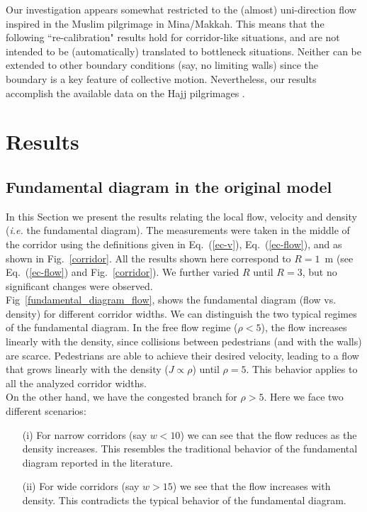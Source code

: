 \documentclass[preprint,12pt]{elsarticle}
\begin{document}
Our investigation appears somewhat restricted to the (almost)
uni-direction flow inspired in the Muslim pilgrimage in Mina/Makkah.
This means that the following ``re-calibration" results hold for
corridor-like situations, and are not intended to be (automatically)
translated to bottleneck situations. Neither can be extended to other
boundary conditions (say, no limiting walls) since the boundary is a
key feature of collective motion. Nevertheless, our results accomplish
the available data on the Hajj pilgrimages \cite{helbing3,lohner1}.



\section{\label{results}Results}


\subsection{\label{fundamental_diagram} Fundamental diagram in the original model}

In this Section we present the results relating the local flow, velocity and density (\textit{i.e.} the fundamental diagram). The measurements were taken in the middle of the corridor using the definitions given in Eq.~(\ref{ec-v}), Eq.~(\ref{ec-flow}), and as shown in Fig.~\ref{corridor}. All the results shown here correspond to $R=1$~m (see Eq.~(\ref{ec-flow}) and Fig.~\ref{corridor}). We further varied $R$ until $R=3$, but no significant changes were observed. \\

Fig~\ref{fundamental_diagram_flow}, shows the fundamental diagram (flow vs. density) for different corridor widths. We can distinguish the two typical regimes of the fundamental diagram. In the free flow regime ($\rho < 5$), the flow increases linearly with the density, since collisions between pedestrians (and with the walls) are scarce. Pedestrians are able to achieve their desired velocity, leading to a flow that grows linearly with the density ($J \propto \rho$) until $\rho=5$. This behavior applies to all the analyzed corridor widths.\\

On the other hand, we have the congested branch  for $\rho > 5$. Here we face two different scenarios:

\begin{itemize}
\item[(i)] For narrow corridors (say $w < 10$) we can see that the flow reduces as the density increases. This resembles the traditional behavior of the fundamental diagram reported in the literature. 
\item[(ii)] For wide corridors (say $w > 15$) we see that the flow increases with density. This contradicts the typical behavior of the fundamental diagram.   
\end{itemize}
\end{document}

